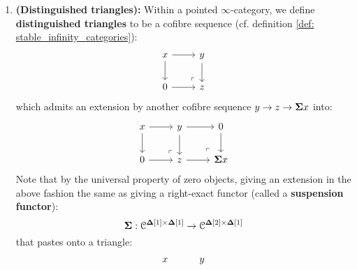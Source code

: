 \begin{definition}
                \begin{enumerate}
                    \item \textbf{(Distinguished triangles):} Within a pointed $\infty$-category, we define \textbf{distinguished triangles} to be a cofibre sequence (cf. definition \ref{def: stable_infinity_categories}):
                        $$
                            \begin{tikzcd}
                                x & y \\
                                0 & z
                                \arrow[from=1-1, to=2-1]
                                \arrow[from=1-1, to=1-2]
                                \arrow[from=1-2, to=2-2]
                                \arrow[from=2-1, to=2-2]
                                \arrow["\lrcorner"{anchor=center, pos=0.125, rotate=180}, draw=none, from=2-2, to=1-1]
                            \end{tikzcd}
                        $$
                    which admits an extension by another cofibre sequence $y \to z \to \suspension x$ into:
                        $$
                            \begin{tikzcd}
                                x & y & 0 \\
                                0 & z & {\suspension x}
                                \arrow[from=1-1, to=2-1]
                                \arrow[from=1-1, to=1-2]
                                \arrow[from=1-2, to=2-2]
                                \arrow[from=2-1, to=2-2]
                                \arrow["\lrcorner"{anchor=center, pos=0.125, rotate=180}, draw=none, from=2-2, to=1-1]
                                \arrow[from=2-2, to=2-3]
                                \arrow[from=1-2, to=1-3]
                                \arrow[from=1-3, to=2-3]
                                \arrow["\lrcorner"{anchor=center, pos=0.125, rotate=180}, draw=none, from=2-3, to=1-2]
                            \end{tikzcd}
                        $$
                    Note that by the universal property of zero objects, giving an extension in the above fashion the same as giving a right-exact functor (called a \textbf{suspension functor}):
                        $$\suspension: \C^{\simp[1] \x \simp[1]} \to \C^{\simp[2] \x \simp[1]}$$
                    that pastes onto a triangle:
                        $$
                            \begin{tikzcd}
                                x & y \\

\end{tikzcd}$$
\end{enumerate}
\end{definition}
